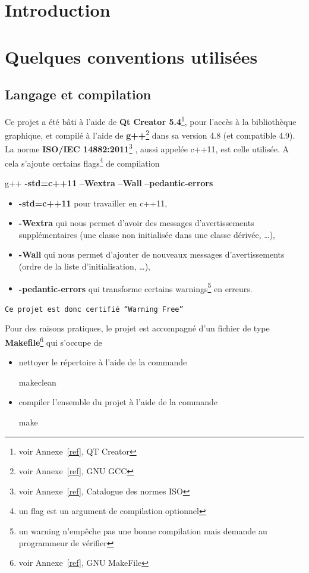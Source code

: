 \documentclass[a4paper,11pt]{report}
\begin{document}

\tableofcontents
\chapter{Introduction}




\chapter[Conventions]{Quelques conventions utilisées}
\section{Langage et compilation}
Ce projet a été bâti à l'aide de \textbf{Qt Creator
5.4}\footnote{voir Annexe~\ref{ref}, QT Creator}, pour l'accès à la bibliothèque
graphique, et compilé à l'aide de
\textbf{g++}\footnote{voir Annexe~\ref{ref}, GNU GCC} dans sa version 4.8 (et
compatible 4.9). La norme \textbf{ISO/IEC
14882:2011}\footnote{voir Annexe~\ref{ref}, Catalogue des normes ISO}
, aussi appelée c++11, est celle
utilisée. A cela s'ajoute certains flags\footnote{un flag est un argument de
compilation optionnel} de compilation
\begin{center}
	g++
	\textbf{-std=c++11}\textvisiblespace
	\textbf{--Wextra}\textvisiblespace
	\textbf{--Wall}\textvisiblespace
	\textbf{--pedantic-errors}
\end{center}
\begin{itemize}
	\item \textbf{-std=c++11} pour travailler en c++11,
	\item \textbf{-Wextra} qui nous permet d'avoir des messages d'avertissements
		supplémentaires (une classe non initialisée dans une classe dérivée,
		\dots),
	\item \textbf{-Wall} qui nous permet d'ajouter de nouveaux messages
		d'avertissements (ordre de la liste d'initialisation, \dots),
	\item \textbf{-pedantic-errors} qui transforme certains warnings\footnote{un
			warning n'empêche pas une bonne compilation mais demande au
		programmeur de vérifier} en erreurs.
\end{itemize}
\begin{center}
	\texttt{Ce projet est donc certifié ``Warning Free''}
\end{center}
Pour des raisons pratiques, le projet est accompagné d'un fichier de type
\textbf{Makefile}\footnote{voir Annexe~\ref{ref}, GNU MakeFile} qui s'occupe de
\begin{itemize}
	\item nettoyer le répertoire à l'aide de la commande 
		\begin{center}
			make\textvisiblespace clean
		\end{center}
	\item compiler l'ensemble du projet à l'aide de la commande
		\begin{center}
			make
		\end{center}
\end{itemize}
\newpage
\end{document}
